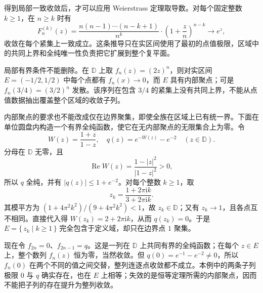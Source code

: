 \ProseParagraphBreak

得到局部一致收敛后，才可以应用 Weierstrass 定理取导数。对每个固定整数 \(k\ge1\)，在 \(n\ge k\) 时有
\[
 F_n^{(k)}(z)=\frac{n(n-1)\cdots(n-k+1)}{n^k}
 \cdot\left(1+\frac zn\right)^{n-k}\longrightarrow e^z,
\]
收敛在每个紧集上一致成立。这条推导只在实区间使用了最初的点值极限，区域中的共同上界和全纯唯一性负责把它扩展到整个复平面。

\ProseParagraphBreak

局部有界条件不能删除。在 \(\mathbb D\) 上取 \(f_n(z)=(2z)^n\)，则对实区间 \(E=(-1/2,1/2)\) 中每个点都有 \(f_n(x)\rightarrow0\)，而 \(E\) 具有内部聚点；可是 \(f_n(3/4)=(3/2)^n\) 发散。该序列在包含 \(3/4\) 的紧集上没有共同上界，不能从点值数据抽出覆盖整个区域的收敛子列。

\ProseParagraphBreak

内部聚点的要求也不能改成仅在边界聚集，即使全族在区域上已有统一界。下面在单位圆盘内构造一个有界全纯函数，使它在无内部聚点的无限集合上为零。令
\[
 W(z)=\frac{1+z}{1-z},\quad
 q(z)=e^{-W(z)}-e^{-2}\quad(z\in\mathbb D).
\]
分母在 \(\mathbb D\) 无零，且
\[
 \operatorname{Re}W(z)=\frac{1-|z|^2}{|1-z|^2}>0,
\]
所以 \(q\) 全纯，并有 \(|q(z)|\le1+e^{-2}\)。对每个整数 \(k\ge1\)，取
\[
 z_k=\frac{1+2\pi\mathrm{i}k}{3+2\pi\mathrm{i}k}.
\]
其模平方为 \((1+4\pi^2k^2)/(9+4\pi^2k^2)<1\)，故 \(z_k\in\mathbb D\)；又有 \(z_k\rightarrow1\)，且各点互不相同。直接代入得 \(W(z_k)=2+2\pi\mathrm{i}k\)，从而 \(q(z_k)=0\)。于是 \(E=\{\,z_k\mid k\ge1\,\}\) 完全包含于定义域，却只在边界点 \(1\) 聚集。

\ProseParagraphBreak

现在令 \(f_{2n}=0\)、\(f_{2n-1}=q\)。这是一列在 \(\mathbb D\) 上共同有界的全纯函数；在每个 \(z\in E\) 上，整个数列 \(f_n(z)\) 恒为零，当然收敛。但 \(q(0)=e^{-1}-e^{-2}\ne0\)，所以 \(f_n(0)\) 在两个不同的值之间交替，整列连逐点收敛都不成立。本例中的两条子列极限 \(0\) 与 \(q\) 确实存在，也在 \(E\) 上相等；失效的是恒等定理所需的内部聚点，因而不能把子列的存在提升为整列收敛。
